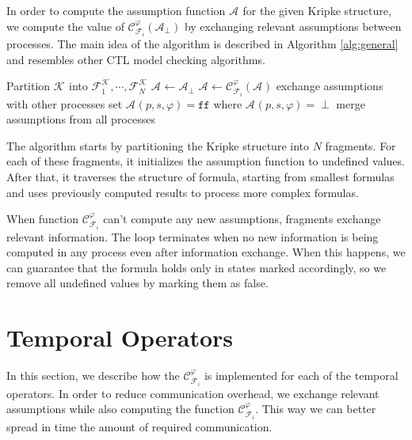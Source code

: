 \documentclass[12pt,oneside]{fithesis2}
\newcommand{\as}[1][]{\ensuremath{\mathcal{A}_{#1}}}
\newcommand{\asemt}{\as[\perp]}
\newcommand{\sem}{\ensuremath{\mathcal{C}_{\kf{i}{}}^\varphi}}
\newcommand{\false}{\ensuremath{\texttt{ff}}}
\newcommand{\ks}[1][]{\ensuremath{\mathcal{K}_{#1}}}
\newcommand{\kf}[2]{\ensuremath{\mathcal{F}^{#2}_{#1}}}
\begin{document}
			In order to compute the assumption function $\as$ for the given Kripke structure, we compute the value of $\sem(\asemt)$ by exchanging relevant assumptions between processes. The main idea of the algorithm is described in Algorithm \ref{alg:general} and resembles other CTL model checking algorithms.
			
			\begin{algorithm}
			\label{alg:general}
			\begin{algorithmic}[1]
				\Procedure{CheckCTL}{$ \psi, \ks $}
					\State Partition $\ks$ into $\kf{1}{\ks}, \cdots, \kf{N}{\ks}$
					\ForAllPar  { $\kf{i}{\ks}$ where $i \in \{1, \cdots, N\} $}
						\State $ \as \gets \asemt$ 						
									\Repeat
										\State $ \as \gets \sem(\as)  $
										\State exchange assumptions with other processes
								\State set $\as(p, s, \varphi) = \false$ where $\as(p, s, \varphi) = \perp$
							\EndFor
						\EndFor						
					\EndForPar
					\State merge assumptions from all processes
				\EndProcedure			
			\end{algorithmic} 
			\end{algorithm}
			
			The algorithm starts by partitioning the Kripke structure into $N$ fragments. For each of these fragments, it initializes the assumption function to undefined values. After that, it traverses the structure of formula, starting from smallest formulas and uses previously computed results to process more complex formulas. 
			
			When function $\sem$ can't compute any new assumptions, fragments exchange relevant information. The loop terminates when no new information is being computed in any process even after information exchange. When this happens, we can guarantee that the formula holds only in states marked accordingly, so we remove all undefined values by marking them as false.						
			
		\section{Temporal Operators}
    
    		In this section, we describe how the $\sem$ is implemented for each of the temporal operators. In order to reduce communication overhead, we exchange relevant assumptions while also computing the function $\sem$. This way we can better spread in time the amount of required communication.
    		
\end{document}
